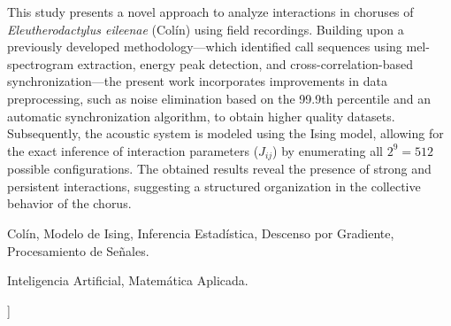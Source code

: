 \documentclass[a4paper,10pt,twocolumn]{article}
\begin{document}
\begin{enabstract}

	This study presents a novel approach to analyze interactions 
	in choruses of \emph{Eleutherodactylus eileenae} (Colín) 
	using field recordings. Building upon a previously 
	developed methodology—which identified call sequences 
	using mel-spectrogram extraction, energy peak detection, 
	and cross-correlation-based synchronization—the present 
	work incorporates improvements in data preprocessing, 
	such as noise elimination based on the 99.9th percentile 
	and an automatic synchronization algorithm, to obtain 
	higher quality datasets. Subsequently, the acoustic 
	system is modeled using the Ising model, allowing for 
	the exact inference of interaction parameters 
	(\( J_{ij} \)) by enumerating all \(2^9 = 512\) possible 
	configurations. The obtained results reveal the presence of 
	strong and persistent interactions, suggesting a structured 
	organization in the collective behavior of the chorus.

\end{enabstract}

\begin{keywords}
	Colín, Modelo de Ising, Inferencia Estadística, Descenso por Gradiente, Procesamiento de Señales.
\end{keywords}

\begin{topics}
	Inteligencia Artificial, Matemática Aplicada.
\end{topics}


\vspace{1cm}
]



\end{document}
